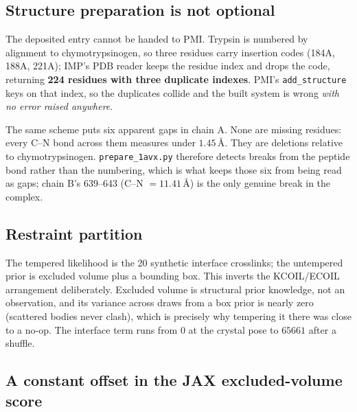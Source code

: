 \documentclass[11pt]{article}
\begin{document}
\subsection{Structure preparation is not optional}

The deposited entry cannot be handed to PMI. Trypsin is numbered by alignment
to chymotrypsinogen, so three residues carry insertion codes (184A, 188A,
221A); IMP's PDB reader keeps the residue index and drops the code, returning
\textbf{224 residues with three duplicate indexes}. PMI's
\texttt{add\_structure} keys on that index, so the duplicates collide and the
built system is wrong \emph{with no error raised anywhere}.

The same scheme puts six apparent gaps in chain A. None are missing residues:
every C--N bond across them measures under $1.45$\,\AA. They are deletions
relative to chymotrypsinogen. \texttt{prepare\_1avx.py} therefore detects
breaks from the peptide bond rather than the numbering, which is what keeps
those six from being read as gaps; chain B's 639--643 (C--N $= 11.41$\,\AA)
is the only genuine break in the complex.

\subsection{Restraint partition}

The tempered likelihood is the 20 synthetic interface crosslinks; the
untempered prior is excluded volume plus a bounding box. This inverts the
KCOIL/ECOIL arrangement deliberately. Excluded volume is structural prior
knowledge, not an observation, and its variance across draws from a box prior
is nearly zero (scattered bodies never clash), which is precisely why
tempering it there was close to a no-op. The interface term runs from $0$ at
the crystal pose to $65661$ after a shuffle.

\subsection{A constant offset in the JAX excluded-volume score}
\label{sec:ev-offset}
\end{document}
